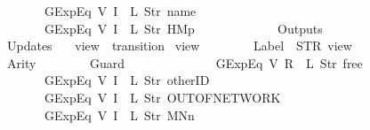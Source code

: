 \begin{isabellebody}
\ \ \ \ \ \ \ \ \ \ \ \ GExp{\isachardot}Eq\ {\isacharparenleft}V\ {\isacharparenleft}I\ {}{\isacharparenright}{\isacharparenright}\ {\isacharparenleft}L\ {\isacharparenleft}Str\ {\isacharprime}{\isacharprime}name{\isacharprime}{\isacharprime}{\isacharparenright}{\isacharparenright}{\isacharcomma}\isanewline
\ \ \ \ \ \ \ \ \ \ \ \ GExp{\isachardot}Eq\ {\isacharparenleft}V\ {\isacharparenleft}I\ {}{\isacharparenright}{\isacharparenright}\ {\isacharparenleft}L\ {\isacharparenleft}Str\ {\isacharprime}{\isacharprime}HM{}p{\isacharprime}{\isacharprime}{\isacharparenright}{\isacharparenright}\isanewline
\ \ \ \ \ \ {\isacharbrackright}{\isacharcomma}\isanewline
\ \ \ \ \ \ Outputs\ {\isacharequal}\ {\isacharbrackleft}{\isacharbrackright}{\isacharcomma}\isanewline
\ \ \ \ \ \ Updates\ {\isacharequal}\ {\isacharbrackleft}{\isacharbrackright}\isanewline
{\isasymrparr}{\isachardoublequoteclose}\isanewline
\isanewline
{}\isamarkupfalse%
\ {\isachardoublequoteopen}view{}{\isachardoublequoteclose}\ {\isacharcolon}{\isacharcolon}\ {\isachardoublequoteopen}transition{\isachardoublequoteclose}\ \isanewline
{\isachardoublequoteopen}view{}\ {\isasymequiv}\ {\isasymlparr}\isanewline
\ \ \ \ \ \ Label\ {\isacharequal}\ STR\ {\isacharprime}{\isacharprime}view{\isacharprime}{\isacharprime}{\isacharcomma}\isanewline
\ \ \ \ \ \ Arity\ {\isacharequal}\ {}{\isacharcomma}\isanewline
\ \ \ \ \ \ Guard\ {\isacharequal}\ {\isacharbrackleft}\isanewline
\ \ \ \ \ \ \ \ \ \ \ \ GExp{\isachardot}Eq\ {\isacharparenleft}V\ {\isacharparenleft}R\ {}{\isacharparenright}{\isacharparenright}\ {\isacharparenleft}L\ {\isacharparenleft}Str\ {\isacharprime}{\isacharprime}free{\isacharprime}{\isacharprime}{\isacharparenright}{\isacharparenright}{\isacharcomma}\isanewline
\ \ \ \ \ \ \ \ \ \ \ \ GExp{\isachardot}Eq\ {\isacharparenleft}V\ {\isacharparenleft}I\ {}{\isacharparenright}{\isacharparenright}\ {\isacharparenleft}L\ {\isacharparenleft}Str\ {\isacharprime}{\isacharprime}otherID{\isacharprime}{\isacharprime}{\isacharparenright}{\isacharparenright}{\isacharcomma}\isanewline
\ \ \ \ \ \ \ \ \ \ \ \ GExp{\isachardot}Eq\ {\isacharparenleft}V\ {\isacharparenleft}I\ {}{\isacharparenright}{\isacharparenright}\ {\isacharparenleft}L\ {\isacharparenleft}Str\ {\isacharprime}{\isacharprime}OUT{\isacharunderscore}OF{\isacharunderscore}NETWORK{\isacharprime}{\isacharprime}{\isacharparenright}{\isacharparenright}{\isacharcomma}\isanewline
\ \ \ \ \ \ \ \ \ \ \ \ GExp{\isachardot}Eq\ {\isacharparenleft}V\ {\isacharparenleft}I\ {}{\isacharparenright}{\isacharparenright}\ {\isacharparenleft}L\ {\isacharparenleft}Str\ {\isacharprime}{\isacharprime}MNn{}{\isacharprime}{\isacharprime}{\isacharparenright}{\isacharparenright}\isanewline

\end{isabellebody}

